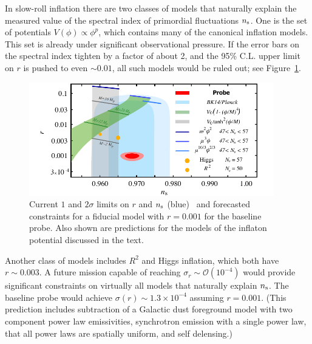In slow-roll inflation there are two classes of models that naturally explain the measured value of the spectral index 
of primordial fluctuations $n_{\rm s}$. 
One is the set of potentials $V(\phi)\propto\phi^p$, which contains many of the canonical inflation models. This 
set is already under significant observational pressure. If the error bars on the spectral index tighten by a factor of about 2, 
and the 95\% C.L. upper limit on $r$ is pushed to even $\sim0.01$, all such models would be 
ruled out; see Figure~\ref{fig:nsrp001}. 
\begin{figure}[ht!]
\hspace{-0.1in}
\parbox{4.in}{\centerline {
\includegraphics[width=4.2in]{figs/nsrlabeledrp001v2} } }
\hspace{-0.05in}
\parbox{2.5in}{
\caption{ \small \setlength{\baselineskip}{0.90\baselineskip}
Current $1$ and $2\sigma $ limits on $r$ and $n_{\rm s}$ (blue)~\cite{Array:2015xqh} and forecasted constraints for a fiducial 
model with $r=0.001$ for the baseline probe. 
Also shown are predictions for the models of the inflaton potential discussed in the text.
\label{fig:nsrp001} } }
\end{figure}

Another class of models includes $R^{2}$ and Higgs inflation, which both have $r\sim0.003$. A future mission 
capable of reaching $\sigma_r\sim\mathcal{O}(10^{-4})$ would provide significant constraints on virtually all models that naturally explain $n_{\rm s}$. 
The baseline probe would achieve $\sigma(r)\sim1.3 \times 10^{-4}$ assuming $r=0.001$. (This
prediction includes subtraction of a Galactic dust foreground model with two component power law emissivities, 
synchrotron emission with a single power law, that all power laws are spatially uniform, and self delensing.) 

